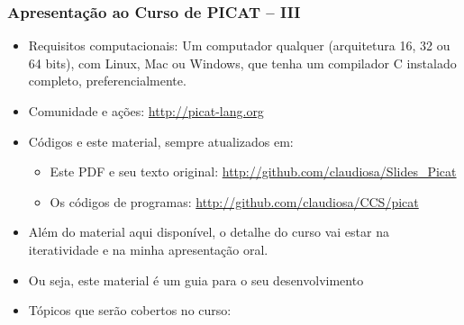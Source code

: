     
\begin{frame}[fragile]
  \frametitle{Apresentação ao Curso de PICAT -- III}
  \begin{itemize}

						
    \item Requisitos computacionais:
    \pause
    Um computador qualquer (arquitetura 16, 32 ou 64 bits), com Linux, Mac ou Windows,
    que tenha um compilador C instalado completo, preferencialmente.

    \item Comunidade e ações: \url{http://picat-lang.org}
    \pause

    \item Códigos e este material, sempre atualizados em: 
    \pause
    \begin{itemize}
      \item  Este PDF e seu texto original:  \url{http://github.com/claudiosa/Slides_Picat}
     \item   Os códigos de programas:  \url{http://github.com/claudiosa/CCS/picat}
    \end{itemize}

			\item Além do material aqui disponível, o detalhe do curso vai estar na iteratividade
			e na minha apresentação oral.
			
			\item Ou seja, este material é  um guia para o seu desenvolvimento


    \item Tópicos  que serão cobertos no curso:
  \end{itemize}

\end{frame}
